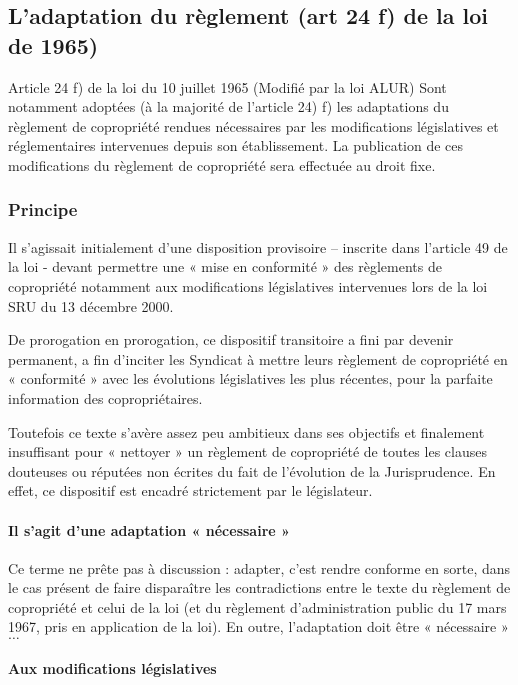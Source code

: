 	\subsection{L’adaptation du règlement (art 24 f) de la loi de 1965)}
	
		Article 24 f) de la loi du 10 juillet 1965 (Modifié par la loi ALUR)
		Sont notamment adoptées (à la majorité de l’article 24) f) les adaptations du règlement de copropriété rendues nécessaires par les modifications législatives et réglementaires intervenues depuis son établissement. La publication de ces modifications du règlement de copropriété sera effectuée au droit fixe.
		
		\subsubsection{Principe}
		
			Il s’agissait initialement d’une disposition provisoire – inscrite dans l’article 49 de la loi - devant permettre une « mise en conformité » des règlements de copropriété notamment aux modifications législatives intervenues lors de la loi SRU du 13 décembre 2000.
			
			De prorogation en prorogation, ce dispositif transitoire a fini par devenir permanent, a fin d’inciter les Syndicat à mettre leurs règlement de copropriété en « conformité » avec les évolutions législatives les plus récentes, pour la parfaite information des copropriétaires.
			
			Toutefois ce texte s’avère assez peu ambitieux dans ses objectifs et finalement insuffisant pour « nettoyer » un règlement de copropriété de toutes les clauses douteuses ou réputées non écrites du fait de l’évolution de la Jurisprudence. En effet, ce dispositif est encadré strictement par le législateur.
			
			\paragraph{Il s’agit d’une adaptation « nécessaire »}
			
				Ce terme ne prête pas à discussion : adapter, c’est rendre conforme en sorte, dans le cas présent de faire disparaître les contradictions entre le texte du règlement de copropriété et celui de la loi (et du règlement d’administration public du 17 mars 1967, pris en application de la loi). En outre, l’adaptation doit être « nécessaire » $\dots$
			
			\paragraph{Aux modifications législatives}
		
